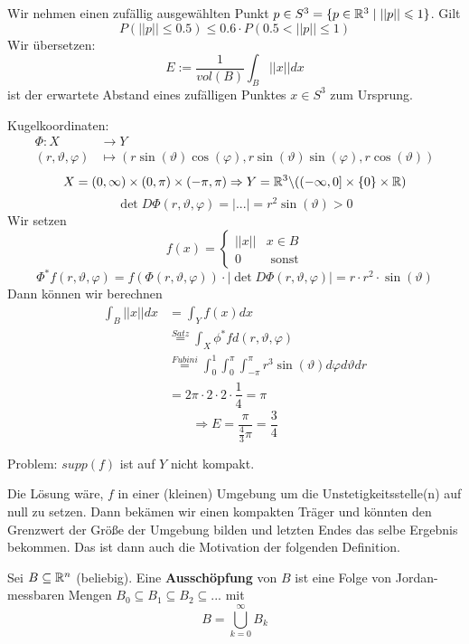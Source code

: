 \documentclass[main.tex]{subfiles}
\begin{document}
\begin{Beispiel}[Wahrscheinlichkeitstheorie]
  Wir nehmen einen zufällig ausgewählten Punkt $p \in S^3 = \{p \in \mathbb{R}^3 \mid ||p|| \leqslant 1 \}$. Gilt
  $$P(||p||\leq 0.5) \leq 0.6 \cdot P(0.5 < ||p|| \leq 1)$$
  Wir übersetzen:
  $$E := \dfrac{1}{vol(B)}\int_B ||x||dx$$
  ist der erwartete Abstand eines zufälligen Punktes $x \in S^3$ zum Ursprung.

  Kugelkoordinaten:
  $$\begin{aligned}
    \Phi: X & \to Y \\
    (r,\vartheta,\varphi) & \mapsto (r \sin(\vartheta)\cos(\varphi),r\sin(\vartheta)\sin(\varphi),r\cos(\vartheta))
  \end{aligned}$$
  $$X = (0,\infty) \times (0, \pi) \times (-\pi,\pi) \Rightarrow Y = \mathbb{R}^3 \backslash ((-\infty,0] \times \{ 0 \} \times \mathbb{R})$$
  $$\det D\Phi(r,\vartheta,\varphi) = |...| = r^2\sin(\vartheta) > 0$$
  Wir setzen
  $$f(x) = \left\{\begin{aligned}
    ||x|| & x \in B \\
    0 & \text{ sonst}
  \end{aligned}\right.$$
  $$\Phi^* f(r, \vartheta,\varphi) = f(\Phi(r,\vartheta,\varphi)) \cdot |\det D\Phi(r, \vartheta,\varphi)| = r \cdot r^2 \cdot \sin(\vartheta)$$
  Dann können wir berechnen
  $$\begin{aligned}
    \int_B||x||dx & = \int_Y f(x)dx \\
    & \stackrel{\scriptscriptstyle Satz}{=} \int_X \phi^* f d(r,\vartheta,\varphi) \\
    & \stackrel{\scriptscriptstyle Fubini}{=} \int_0^1 \int_0^\pi \int_{-\pi}^\pi r^3 \sin(\vartheta) d \varphi d \vartheta d r \\
    & = 2 \pi \cdot 2 \cdot 2 \cdot \dfrac{1}{4} = \pi
  \end{aligned}$$
  $$\Rightarrow E = \dfrac{\pi}{\frac{4}{3} \pi} = \dfrac{3}{4}$$

  Problem: $supp(f)$ ist auf $Y$ nicht kompakt.

  Die Lösung wäre, $f$ in einer (kleinen) Umgebung um die Unstetigkeitsstelle(n) auf null zu setzen. Dann bekämen wir einen kompakten Träger und könnten den Grenzwert der Größe der Umgebung bilden und letzten Endes das selbe Ergebnis bekommen. Das ist dann auch die Motivation der folgenden Definition.
\end{Beispiel}

\begin{Definition}[Ausschöpfung]
  Sei $B \subseteq \mathbb{R}^n$ (beliebig). Eine \textbf{Ausschöpfung} von $B$ ist eine Folge von Jordan-messbaren Mengen $B_0 \subseteq B_1 \subseteq B_2 \subseteq ...$ mit
  $$B = \bigcup_{k = 0}^\infty B_k$$
\end{Definition}
\end{document}
